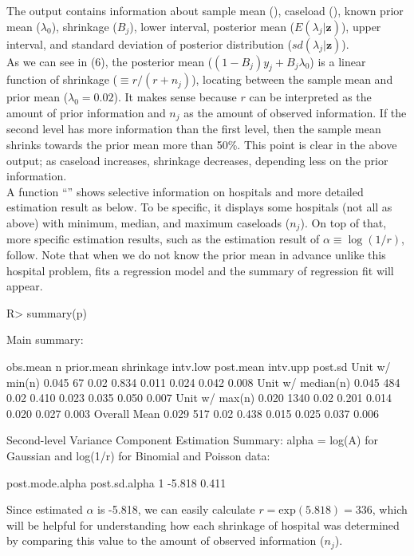 \documentclass[article]{jss}
\begin{document}
The output contains information about sample mean (), caseload (), known prior mean ($\lambda_{0}$), shrinkage ($B_{j}$), lower interval, posterior mean ($E(\lambda_{j}\vert \textbf{z})$), upper interval, and standard deviation of posterior distribution ($sd(\lambda_{j}\vert \textbf{z})$).
\\

As we can see in (6), the posterior mean ($(1-B_{j})y_{j} + B_{j}\lambda_{0}$) is a linear function of shrinkage ($\equiv r / (r + n_{j})$), locating between the sample mean and prior mean ($\lambda_{0}=0.02$). It makes sense because $r$ can be interpreted as the amount of prior information and $n_{j}$ as the amount of observed information. If the second level has more information than the first level, then the sample mean shrinks towards the prior mean more than 50\%. This point is clear in the above output; as caseload increases, shrinkage decreases, depending less on the prior information.
\\

A function ``'' shows selective information on hospitals and more detailed estimation result as below. To be specific, it displays some hospitals (not all as above) with minimum, median, and maximum caseloads ($n_{j}$). On top of that, more specific estimation results, such as the estimation result of $\alpha\equiv\log(1/r)$, follow. Note that when we do not know the prior mean in advance unlike this hospital problem,  fits a regression model and the summary of regression fit will appear.
\begin{CodeChunk}
\begin{CodeInput}
R> summary(p)
\end{CodeInput}
\begin{CodeOutput}
Main summary:

                  obs.mean    n prior.mean shrinkage intv.low post.mean intv.upp post.sd
Unit w/ min(n)       0.045   67       0.02     0.834    0.011     0.024    0.042   0.008
Unit w/ median(n)    0.045  484       0.02     0.410    0.023     0.035    0.050   0.007
Unit w/ max(n)       0.020 1340       0.02     0.201    0.014     0.020    0.027   0.003
Overall Mean         0.029  517       0.02     0.438    0.015     0.025    0.037   0.006


Second-level Variance Component Estimation Summary:
alpha = log(A) for Gaussian and log(1/r) for Binomial and Poisson data:

  post.mode.alpha post.sd.alpha
1          -5.818         0.411
\end{CodeOutput}
\end{CodeChunk}
Since estimated $\alpha$ is -5.818, we can easily calculate $r=\textrm{exp}(5.818)=336$, which will be helpful for understanding how each shrinkage of hospital was determined by comparing this value to the amount of observed information ($n_{j}$).
\\
\end{document}
